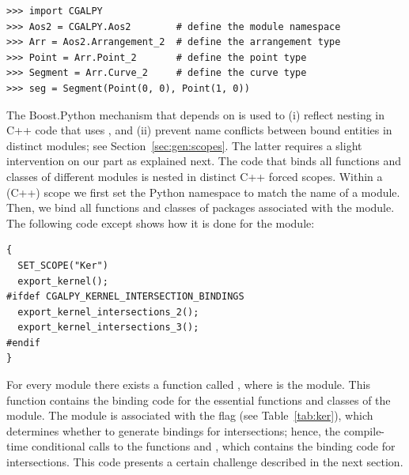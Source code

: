 \begin{lstlisting}[style=pythonStyle]
>>> import CGALPY
>>> Aos2 = CGALPY.Aos2        # define the module namespace
>>> Arr = Aos2.Arrangement_2  # define the arrangement type
>>> Point = Arr.Point_2       # define the point type
>>> Segment = Arr.Curve_2     # define the curve type
>>> seg = Segment(Point(0, 0), Point(1, 0))
\end{lstlisting}

The Boost.Python mechanism that depends on  is used to (i) reflect nesting in C++ code that uses \cgal, and (ii) prevent name conflicts between bound entities in distinct modules; see Section~\ref{sec:gen:scopes}. The latter requires a slight intervention on our part as explained next. The code that binds all functions and classes of different modules is nested in distinct C++ forced scopes. Within a (C++) scope we first set the Python namespace to match the name of a module. Then, we bind all functions and classes of \cgal{} packages associated with the module. The following code except shows how it is done for the \iiDandiiiDGeometryKernelPackage{}
module:

\begin{lstlisting}[style=cppNumberedStyle]
{
  SET_SCOPE("Ker")
  export_kernel();
#ifdef CGALPY_KERNEL_INTERSECTION_BINDINGS
  export_kernel_intersections_2();
  export_kernel_intersections_3();
#endif
}
\end{lstlisting}

For every module there exists a function called , where  is the module. This function contains the binding code for the essential functions and classes of the module. The \iiDandiiiDGeometryKernelPackage{} module is associated with the \cmake{}  flag (see Table~\ref{tab:ker}), which determines whether to generate bindings for intersections; hence, the compile-time conditional calls to the functions  and , which contains the binding code for intersections. This code presents a certain challenge described in the next section.


